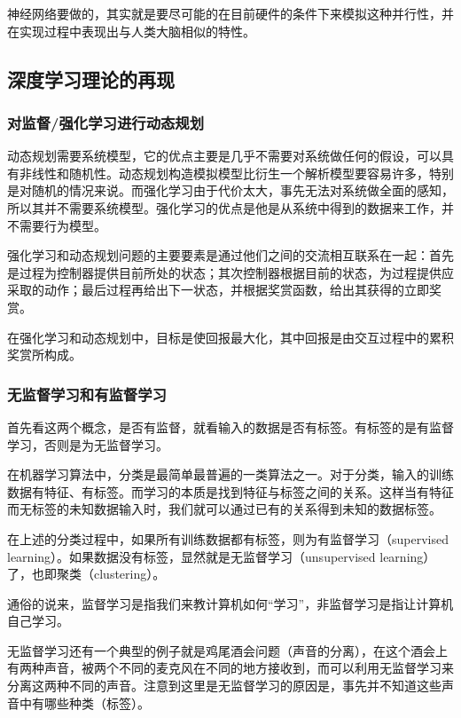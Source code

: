\documentclass[10pt,journal,compsoc]{IEEEtran}
\begin{document}
神经网络要做的，其实就是要尽可能的在目前硬件的条件下来模拟这种并行性，并在实现过程中表现出与人类大脑相似的特性。

\subsection{深度学习理论的再现}
\subsubsection{对监督/强化学习进行动态规划}
动态规划需要系统模型，它的优点主要是几乎不需要对系统做任何的假设，可以具有非线性和随机性。动态规划构造模拟模型比衍生一个解析模型要容易许多，特别是对随机的情况来说。而强化学习由于代价太大，事先无法对系统做全面的感知，所以其并不需要系统模型。强化学习的优点是他是从系统中得到的数据来工作，并不需要行为模型。\par
强化学习和动态规划问题的主要要素是通过他们之间的交流相互联系在一起：首先是过程为控制器提供目前所处的状态；其次控制器根据目前的状态，为过程提供应采取的动作；最后过程再给出下一状态，并根据奖赏函数，给出其获得的立即奖赏。\par
在强化学习和动态规划中，目标是使回报最大化，其中回报是由交互过程中的累积奖赏所构成。
\subsubsection{无监督学习和有监督学习}
首先看这两个概念，是否有监督，就看输入的数据是否有标签。有标签的是有监督学习，否则是为无监督学习。\par
在机器学习算法中，分类是最简单最普遍的一类算法之一。对于分类，输入的训练数据有特征、有标签。而学习的本质是找到特征与标签之间的关系。这样当有特征而无标签的未知数据输入时，我们就可以通过已有的关系得到未知的数据标签。\par
在上述的分类过程中，如果所有训练数据都有标签，则为有监督学习（supervised learning）。如果数据没有标签，显然就是无监督学习（unsupervised learning）了，也即聚类（clustering）。\par
通俗的说来，监督学习是指我们来教计算机如何“学习”，非监督学习是指让计算机自己学习。\par
无监督学习还有一个典型的例子就是鸡尾酒会问题（声音的分离），在这个酒会上有两种声音，被两个不同的麦克风在不同的地方接收到，而可以利用无监督学习来分离这两种不同的声音。注意到这里是无监督学习的原因是，事先并不知道这些声音中有哪些种类（标签）。
\end{document}
